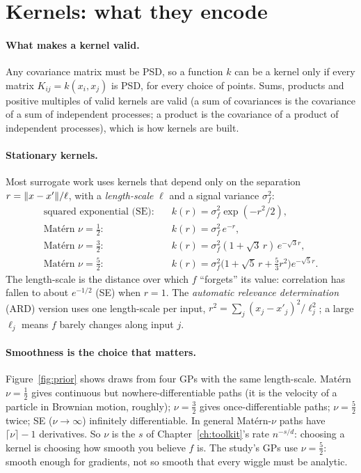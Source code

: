 \section{Kernels: what they encode}

\paragraph{What makes a kernel valid.} Any covariance matrix must be PSD, so a function $k$ can be a kernel only if
every matrix $K_{ij} = k(x_i,x_j)$ is PSD, for every choice of points. Sums, products and positive multiples of
valid kernels are valid (a sum of covariances is the covariance of a sum of independent processes; a product is the
covariance of a product of independent processes), which is how kernels are built.

\paragraph{Stationary kernels.} Most surrogate work uses kernels that depend only on the separation $r =
\lVert x - x'\rVert/\ell$, with a \emph{length-scale} $\ell$ and a signal variance $\sigma_f^2$:
\begin{align}
  \text{squared exponential (SE):}\quad & k(r) = \sigma_f^2 \exp(-r^2/2), \\
  \text{Mat\'ern } \nu = \tfrac12:\quad & k(r) = \sigma_f^2\, e^{-r}, \\
  \text{Mat\'ern } \nu = \tfrac32:\quad & k(r) = \sigma_f^2 (1 + \sqrt3\, r)\, e^{-\sqrt3 r}, \\
  \text{Mat\'ern } \nu = \tfrac52:\quad & k(r) = \sigma_f^2 \big(1 + \sqrt5\, r + \tfrac53 r^2\big) e^{-\sqrt5 r}.
\end{align}
The length-scale is the distance over which $f$ ``forgets'' its value: correlation has fallen to about $e^{-1/2}$
(SE) when $r = 1$. The \emph{automatic relevance determination} (ARD) version uses one length-scale per input,
$r^2 = \sum_j (x_j - x'_j)^2/\ell_j^2$; a large $\ell_j$ means $f$ barely changes along input $j$.

\paragraph{Smoothness is the choice that matters.} Figure~\ref{fig:prior} shows draws from four GPs with the same
length-scale. Mat\'ern $\nu = \tfrac12$ gives continuous but nowhere-differentiable paths (it is the velocity of a
particle in Brownian motion, roughly); $\nu = \tfrac32$ gives once-differentiable paths; $\nu = \tfrac52$ twice;
SE ($\nu \to \infty$) infinitely differentiable. In general Mat\'ern-$\nu$ paths have $\lceil\nu\rceil - 1$
derivatives. So $\nu$ is the $s$ of Chapter~\ref{ch:toolkit}'s rate $n^{-s/d}$: choosing a kernel is choosing how
smooth you believe $f$ is. The study's GPs use $\nu = \tfrac52$: smooth enough for gradients, not so smooth that
every wiggle must be analytic.

